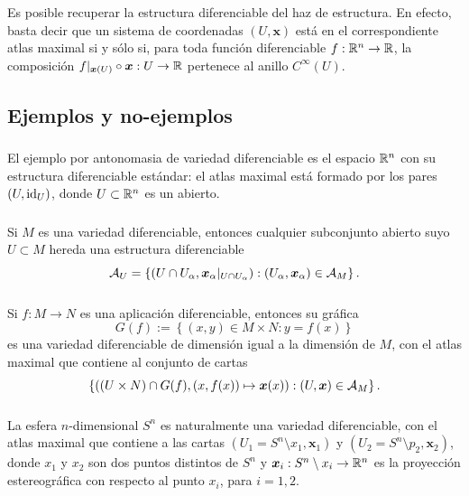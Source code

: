 \documentclass[11pt,a4paper]{amsbook}
\theoremstyle{remark} \newtheorem{rmk}[subsection]{Observación}
\theoremstyle{definition} \newtheorem{defn}[subsection]{Definición}
\theoremstyle{definition} \newtheorem{ex}[subsection]{Ejemplo}
\theoremstyle{definition} \newtheorem{ej}[subsection]{Ejercicio}
\begin{document}
  Es posible recuperar la estructura diferenciable del haz de estructura. En efecto, basta decir que un sistema de coordenadas $(U,\bm{x})$ está en el correspondiente atlas maximal si y sólo si, para toda función diferenciable $f: \mathbb R^n \rightarrow \mathbb R$, la composición $f|_{\bm{x}(U)} \circ \bm{x}:U\rightarrow \mathbb R$ pertenece al anillo $C^\infty(U)$.

\subsection{Ejemplos y no-ejemplos}
\subsubsection{} El ejemplo por antonomasia de variedad diferenciable es el espacio $\mathbb R^n$ con su estructura diferenciable estándar: el atlas maximal está formado por los pares $(U,\mathrm{id}_U)$, donde $U\subset \mathbb R^n$ es un abierto.

\subsubsection{} Si $M$ es una variedad diferenciable, entonces cualquier subconjunto abierto suyo $U\subset M$ hereda una estructura diferenciable
\begin{equation*}
\mathcal A_U = \left\{ (U \cap U_\alpha,\bm{x}_\alpha|_{U\cap U_\alpha}): (U_\alpha,\bm{x}_\alpha) \in \mathcal A_M \right\}.
\end{equation*}

\subsubsection{} Si $f:M\rightarrow N$ es una aplicación diferenciable, entonces su gráfica
\begin{equation*}
G(f):= \left\{ (x,y) \in M \times N: y=f(x) \right\}
\end{equation*}
es una variedad diferenciable de dimensión igual a la dimensión de $M$, con el atlas maximal que contiene al conjunto de cartas
\begin{equation*}
\left\{ ((U \times N)\cap G(f), (x,f(x)) \mapsto \bm{x}(x)) : (U,\bm{x}) \in \mathcal A_M \right\}.
\end{equation*}

\subsubsection{} La esfera $n$-dimensional $S^n$ es naturalmente una variedad diferenciable, con el atlas maximal que contiene a las cartas $(U_1=S^n \setminus x_1,\bm{x}_1)$ y $(U_2=S^n \setminus p_2,\bm{x}_2)$, donde $x_1$ y $x_2$ son dos puntos distintos de $S^n$ y $\bm{x}_i:S^n \setminus x_i\rightarrow \mathbb R^n$ es la proyección estereográfica con respecto al punto $x_i$, para $i=1,2$.
\end{document}
